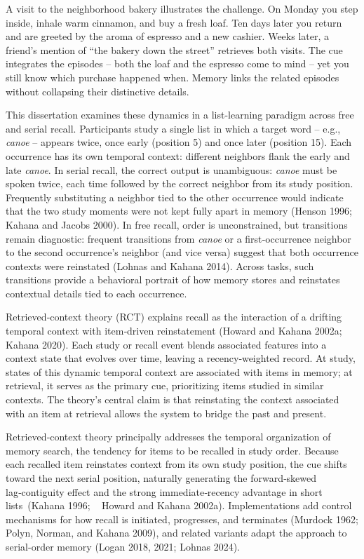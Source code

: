 \documentclass[
  letterpaper,
  11pt,
  english,
  singlespacing,
  headsepline]{MastersDoctoralThesis}
\begin{document}
A visit to the neighborhood bakery illustrates the challenge. On Monday
you step inside, inhale warm cinnamon, and buy a fresh loaf. Ten days
later you return and are greeted by the aroma of espresso and a new
cashier. Weeks later, a friend's mention of ``the bakery down the
street'' retrieves both visits. The cue integrates the episodes -- both
the loaf and the espresso come to mind -- yet you still know which
purchase happened when. Memory links the related episodes without
collapsing their distinctive details.

This dissertation examines these dynamics in a list-learning paradigm
across free and serial recall. Participants study a single list in which
a target word -- e.g., \emph{canoe} -- appears twice, once early
(position 5) and once later (position 15). Each occurrence has its own
temporal context: different neighbors flank the early and late
\emph{canoe}. In serial recall, the correct output is unambiguous:
\emph{canoe} must be spoken twice, each time followed by the correct
neighbor from its study position. Frequently substituting a neighbor
tied to the other occurrence would indicate that the two study moments
were not kept fully apart in memory (Henson 1996; Kahana and Jacobs
2000). In free recall, order is unconstrained, but transitions remain
diagnostic: frequent transitions from \emph{canoe} or a first‑occurrence
neighbor to the second occurrence's neighbor (and vice versa) suggest
that both occurrence contexts were reinstated (Lohnas and Kahana 2014).
Across tasks, such transitions provide a behavioral portrait of how
memory stores and reinstates contextual details tied to each occurrence.

Retrieved‑context theory (RCT) explains recall as the interaction of a
drifting temporal context with item‑driven reinstatement (Howard and
Kahana 2002a; Kahana 2020). Each study or recall event blends associated
features into a context state that evolves over time, leaving a
recency‑weighted record. At study, states of this dynamic temporal
context are associated with items in memory; at retrieval, it serves as
the primary cue, prioritizing items studied in similar contexts. The
theory's central claim is that reinstating the context associated with
an item at retrieval allows the system to bridge the past and present.

Retrieved‑context theory principally addresses the temporal organization
of memory search, the tendency for items to be recalled in study order.
Because each recalled item reinstates context from its own study
position, the cue shifts toward the next serial position, naturally
generating the forward‑skewed lag‑contiguity effect and the strong
immediate‑recency advantage in short lists~(Kahana 1996; ~ Howard and
Kahana 2002a). Implementations add control mechanisms for how recall is
initiated, progresses, and terminates (Murdock 1962; Polyn, Norman, and
Kahana 2009), and related variants adapt the approach to serial-order
memory (Logan 2018, 2021; Lohnas 2024).
\end{document}

